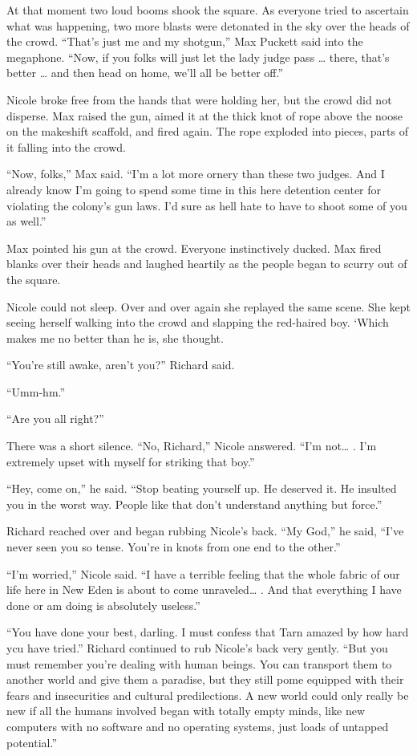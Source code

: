 \documentclass[]{article}
\begin{document}
{At that moment two loud booms shook the square. As everyone tried to ascertain what was happening, two more blasts were detonated in the sky over the heads of the crowd. “That’s just me and my shotgun,” Max Puckett said into the megaphone. “Now, if you folks will just let the lady judge pass … there, that’s better … and then head on home, we’ll all be better off.”

Nicole broke free from the hands that were holding her, but the crowd did not disperse. Max raised the gun, aimed it at the thick knot of rope above the noose on the makeshift scaffold, and fired again. The rope exploded into pieces, parts of it falling into the crowd.

“Now, folks,” Max said. “I’m a lot more ornery than these two judges. And I already know I’m going to spend some time in this here detention center for violating the colony’s gun laws. I’d sure as hell hate to have to shoot some of you as well.”

Max pointed his gun at the crowd. Everyone instinctively ducked. Max fired blanks over their heads and laughed heartily as the people began to scurry out of the square.

Nicole could not sleep. Over and over again she replayed the same scene. She kept seeing herself walking into the crowd and slapping the red-haired boy. ‘Which makes me no better than he is, she thought.

“You’re still awake, aren’t you?” Richard said.

“Umm-hm.”

“Are you all right?”

There was a short silence. “No, Richard,” Nicole answered. “I’m not… . I’m extremely upset with myself for striking that boy.”

“Hey, come on,” he said. “Stop beating yourself up. He deserved it. He insulted you in the worst way. People like that don’t understand anything but force.”

Richard reached over and began rubbing Nicole’s back. “My God,” he said, “I’ve never seen you so tense. You’re in knots from one end to the other.”

“I’m worried,” Nicole said. “I have a terrible feeling that the whole fabric of our life here in New Eden is about to come unraveled… . And that everything I have done or am doing is absolutely useless.”

“You have done your best, darling. I must confess that Tarn amazed by how hard ycu have tried.” Richard continued to rub Nicole’s back very gently. “But you must remember you’re dealing with human beings. You can transport them to another world and give them a paradise, but they still pome equipped with their fears and insecurities and cultural predilections. A new world could only really be new if all the humans involved began with totally empty minds, like new computers with no software and no operating systems, just loads of untapped potential.”

}
\end{document}
